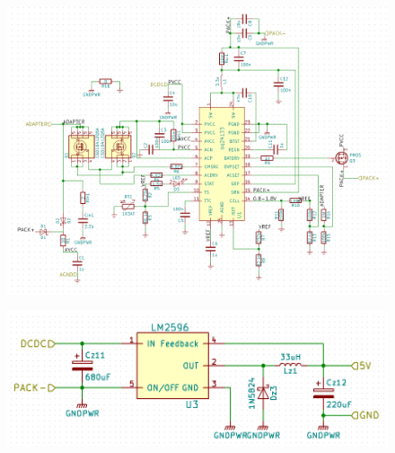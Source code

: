 \begin{figure}[h]
	\centering
    \includegraphics[width=\linewidth]{Figures/gasgauge_sch_bq24133.png}
	\label{fig:schbmsr}
\end{figure}
\begin{figure}[h]
	\centering
    \includegraphics[width=\linewidth]{Figures/gasgauge_sch_lm2529.png}
	\label{fig:schbmsr}
\end{figure}


\clearpage
